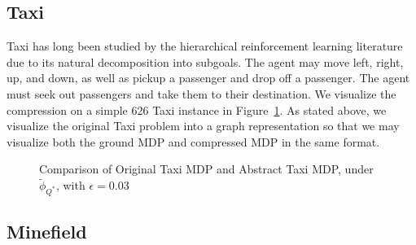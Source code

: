 \documentclass{article}
\newcommand{\ep}{\widetilde \phi}
\newcommand{\epQ}{\ep_{Q^*}}
\begin{document}
\subsection{Taxi}

Taxi has long been studied by the hierarchical reinforcement learning literature due to its natural decomposition into subgoals. The agent may move left, right, up, and down, as well as pickup a passenger and drop off a passenger. The agent must seek out passengers and take them to their destination. We visualize the compression on a simple 626 Taxi instance in Figure~\ref{fig:taxi-visual}. As stated above, we visualize the original Taxi problem into a graph representation so that we may visualize both the ground MDP and compressed MDP in the same format.

\begin{figure}[h]
\label{fig:taxi-visual}
\caption{Comparison of Original Taxi MDP and Abstract Taxi MDP, under $\epQ$, with $\epsilon=0.03$}
\end{figure} 




\subsection{Minefield}
\end{document}
